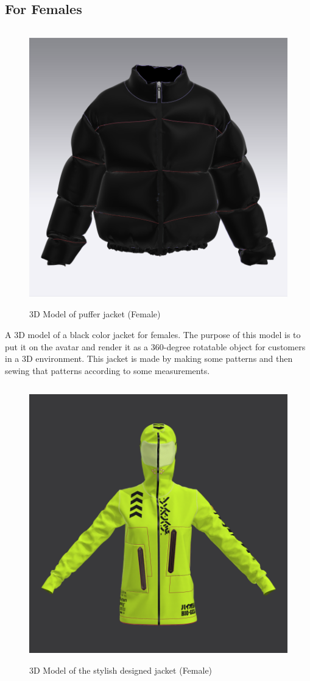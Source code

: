 \subsection{For Females}
\begin{figure}[H]
    \centering
    \includegraphics[width=13cm,height=12cm]{Figures/3DJackets/female1.png}
    \caption{3D Model of puffer jacket (Female)}
    \label{fig1:3D Model of puffer jacket (Female)}
\end{figure}
\justifying
A 3D model of a black color jacket for females. The purpose of this model is to put it on the avatar and render it as a 360-degree rotatable object for customers in a 3D environment. This jacket is made by making some patterns and then sewing that patterns according to some measurements.
\begin{figure}[H]
    \centering
    \includegraphics[width=13cm,height=12cm]{Figures/3DJackets/female2.png}
    \caption{3D Model of the stylish designed jacket (Female)}
    \label{3D Model of the stylish designed jacket (Female)}

\end{figure}
